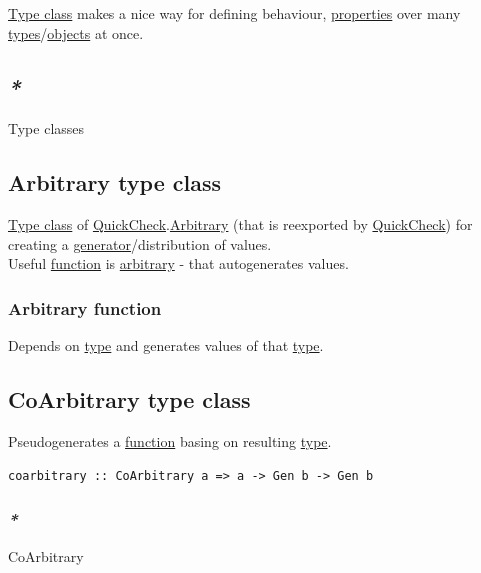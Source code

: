 \documentclass[a4paper,14pt,oneside]{book}
\begin{document}
\hyperref[orgd08ec75]{Type class} makes a nice way for defining behaviour, \hyperref[org533778b]{properties} over many \hyperref[orgb6d8f90]{types}/\hyperref[orge4acbac]{objects} at once.\\

\subsection{\emph{*}}
\label{sec:org4ec007c}

\label{org8d9d701}Type classes\\

\subsection{\label{orga04a813}Arbitrary type class}
\label{sec:orgbfb8d3c}
\hyperref[orgd08ec75]{Type class} of \hyperref[orgb1a02d6]{QuickCheck}.\hyperref[org5823c91]{Arbitrary} (that is reexported by \hyperref[orgb1a02d6]{QuickCheck}) for creating a \hyperref[orgb1a0f1d]{generator}/distribution of values.\\
Useful \hyperref[org062ed2a]{function} is \hyperref[org5823c91]{arbitrary} - that autogenerates values.\\

\subsubsection{\label{org3b289e6}Arbitrary function}
\label{sec:orgad9bf00}
Depends on \hyperref[org38dea24]{type} and generates values of that \hyperref[org38dea24]{type}.\\

\subsection{\label{orge74bca7}CoArbitrary type class}
\label{sec:orgcdfc26f}
Pseudogenerates a \hyperref[org062ed2a]{function} basing on resulting \hyperref[org38dea24]{type}.\\
\begin{verbatim}
coarbitrary :: CoArbitrary a => a -> Gen b -> Gen b
\end{verbatim}

\subsubsection{\emph{*}}
\label{sec:orgfc65920}

\label{orgb1f950f}CoArbitrary\\
\end{document}
